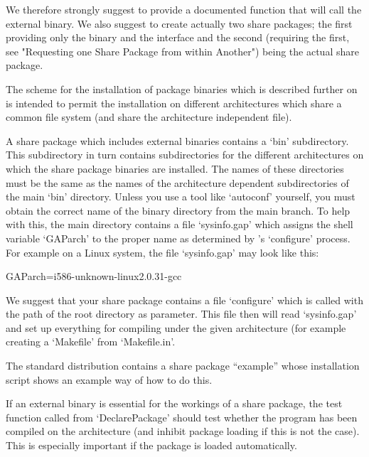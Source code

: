 We therefore strongly suggest to provide a documented {\GAP} function
that will call the external binary. We also suggest to create actually
two share  packages; the first providing only the binary and the
interface and the second (requiring the first, see "Requesting one
Share Package from within Another") being the actual share package.


The scheme for the installation of package binaries which is described
further on is intended to permit  the installation on different
architectures which  share a common file  system (and share the
architecture independent file).

A share package  which includes external binaries contains a `bin'
subdirectory. This subdirectory in turn contains subdirectories for
the different architectures on which the share package binaries are
installed.  The names of these directories must be the same as the
names of the architecture dependent subdirectories of the main `bin'
directory. Unless you use a tool like `autoconf' yourself, you must
obtain the correct name of the binary directory from the main {\GAP}
branch. To help with this, the main {\GAP} directory contains a file
`sysinfo.gap' which assigns the shell variable `GAParch' to the proper
name as determined by {\GAP}'s `configure' process. For example on a
Linux system, the file `sysinfo.gap' may  look like this:

\begintt
GAParch=i586-unknown-linux2.0.31-gcc
\endtt

We suggest that your share package contains a file `configure' which
is  called with the  path of  the  {\GAP} root directory  as
parameter. This file then  will  read `sysinfo.gap' and set  up
everything for compiling under the given architecture (for example
creating a `Makefile' from `Makefile.in'.

The standard {\GAP} distribution contains a share package ``example''
whose installation script shows an example way of how to do this.


If an external binary is essential for the  workings of a share package, the
test function called  from `DeclarePackage' should test whether the program
has been compiled on the architecture (and inhibit package loading if this
is not the case). This is especially important if the package is loaded
automatically.

